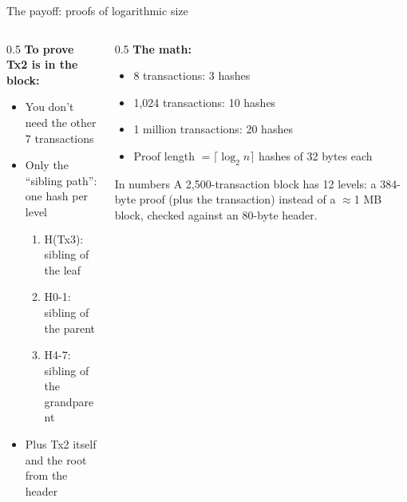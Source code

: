 \ifdefined\PRESENTATION\else\PassOptionsToClass{handout}{beamer}\fi\documentclass[aspectratio=169, lualatex]{beamer}
\begin{document}
\begin{frame}{The payoff: proofs of logarithmic size}
	\begin{columns}[c]
		\begin{column}{0.5\textwidth}
			\textbf{To prove Tx2 is in the block:}
			\begin{itemize}
				\item You don't need the other 7 transactions
				\item Only the ``sibling path'': one hash per level
				      \begin{enumerate}
					      \item H(Tx3): sibling of the leaf
					      \item H0-1: sibling of the parent
					      \item H4-7: sibling of the grandparent
				      \end{enumerate}
				\item Plus Tx2 itself and the root from the header
			\end{itemize}
		\end{column}
		\begin{column}{0.5\textwidth}
			\textbf{The math:}
			\begin{itemize}
				\item 8 transactions: 3 hashes
				\item 1,024 transactions: 10 hashes
				\item 1 million transactions: 20 hashes
				\item Proof length $= \lceil \log_2 n \rceil$ hashes of 32 bytes each
			\end{itemize}
			\begin{exampleblock}{In numbers}
				A 2,500-transaction block has 12 levels: a 384-byte proof (plus the transaction) instead of a $\approx$1 MB block, checked against an 80-byte header.
			\end{exampleblock}
		\end{column}
	\end{columns}
\end{frame}
\end{document}
